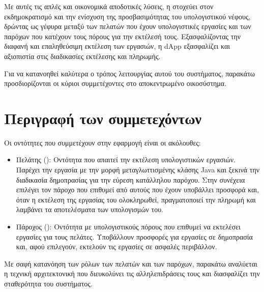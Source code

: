 Με αυτές τις απλές και οικονομικά αποδοτικές λύσεις, η  στοχεύει στον εκδημοκρατισμό και την ενίσχυση της προσβασιμότητας του υπολογιστικού νέφους, δρώντας ως γέφυρα μεταξύ των πελατών που έχουν υπολογιστικές εργασίες και των παρόχων που κατέχουν τους πόρους για την εκτέλεσή τους. Εξασφαλίζοντας την διαφανή και επαληθεύσιμη εκτέλεση των εργασιών, η dApp εξασφαλίζει και αξιοπιστία στις διαδικασίες εκτέλεσης και πληρωμής.

Για να κατανοηθεί καλύτερα ο τρόπος λειτουργίας αυτού του συστήματος, παρακάτω προσδιορίζονται οι κύριοι συμμετέχοντες στο αποκεντρωμένο οικοσύστημα.

\section{Περιγραφή των συμμετεχόντων}
Οι οντότητες που συμμετέχουν στην εφαρμογή είναι οι ακόλουθες:
\begin{itemize}
    \item Πελάτης (): Οντότητα που απαιτεί την εκτέλεση υπολογιστικών εργασιών. 
    Παρέχει την εργασία με την μορφή μεταγλωττισμένης κλάσης Java και ξεκινά την διαδικασία δημοπρασίας για την εύρεση κατάλληλου παρόχου. Στην συνέχεια επιλέγει τον πάροχο που επιθυμεί από αυτούς που έχουν υποβάλλει προσφορά και, όταν η εκτέλεση της εργασίας του ολοκληρωθεί, πραγματοποιεί την πληρωμή και λαμβάνει τα αποτελέσματα των υπολογισμών του.
    \item Πάροχος (): Οντότητα με υπολογιστικούς πόρους που επιθυμεί να εκτελέσει εργασίες για τους πελάτες. Υποβάλλουν προσφορές για εργασίες σε δημοπρασία και, αφού επιλεγούν, εκτελούν τις εργασίες σε ασφαλές περιβάλλον.
\end{itemize}    

Με σαφή κατανόηση των ρόλων των πελατών και των παρόχων, παρακάτω αναλύεται η τεχνική αρχιτεκτονική που διευκολύνει τις αλληλεπιδράσεις τους και διασφαλίζει την σταθερότητα του συστήματος.

